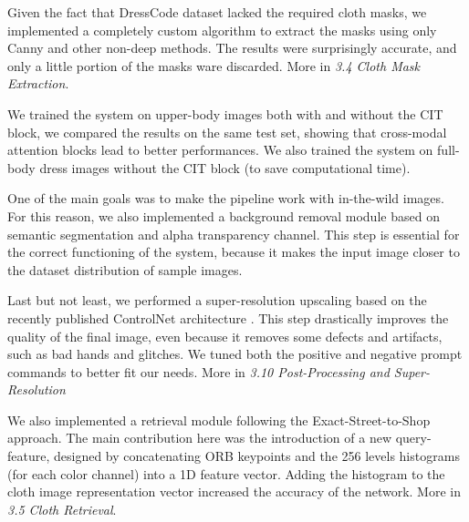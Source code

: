 Given the fact that DressCode dataset lacked the required cloth masks, we implemented a completely custom algorithm to extract the masks using only Canny and other non-deep methods. The results were surprisingly accurate, and only a little portion of the masks ware discarded. More in \textit{3.4 Cloth Mask Extraction}.

We trained the system on upper-body images both with and without the CIT block, we compared the results on the same test set, showing that cross-modal attention blocks lead to better performances. 
We also trained the system on full-body dress images without the CIT block (to save computational time). 

One of the main goals was to make the pipeline work with in-the-wild images. For this reason, we also implemented a background removal module based on semantic segmentation and alpha transparency channel. This step is essential for the correct functioning of the system, because it makes the input image closer to the dataset distribution of sample images.

Last but not least, we performed a super-resolution upscaling based on the recently published ControlNet architecture \cite{controlnet}. This step drastically improves the quality of the final image, even because it removes some defects and artifacts, such as bad hands and glitches. We tuned both the positive and negative prompt commands  to better fit our needs. More in \textit{3.10 Post-Processing and Super-Resolution}

We also implemented a retrieval module following the Exact-Street-to-Shop \cite{stree2shop} approach. The main contribution here was the introduction of a new query-feature, designed by concatenating ORB keypoints and the 256 levels histograms (for each color channel) into a 1D feature vector. Adding the histogram to the cloth image representation vector increased the accuracy of the network. More in \textit{3.5 Cloth Retrieval}.

\hfill



